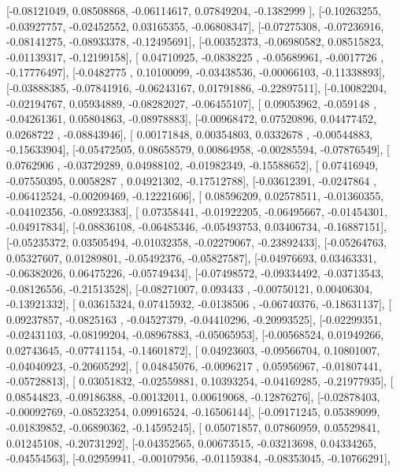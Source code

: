 \documentclass{article}
\begin{document}
       [-0.08121049,  0.08508868, -0.06114617,  0.07849204, -0.1382999 ],
       [-0.10263255, -0.03927757, -0.02452552,  0.03165355, -0.06808347],
       [-0.07275308, -0.07236916, -0.08141275, -0.08933378, -0.12495691],
       [-0.00352373, -0.06980582,  0.08515823, -0.01139317, -0.12199158],
       [ 0.04710925, -0.0838225 , -0.05689961, -0.0017726 , -0.17776497],
       [-0.0482775 ,  0.10100099, -0.03438536, -0.00066103, -0.11338893],
       [-0.03888385, -0.07841916, -0.06243167,  0.01791886, -0.22897511],
       [-0.10082204, -0.02194767,  0.05934889, -0.08282027, -0.06455107],
       [ 0.09053962, -0.059148  , -0.04261361,  0.05804863, -0.08978883],
       [-0.00968472,  0.07520896,  0.04477452,  0.0268722 , -0.08843946],
       [ 0.00171848,  0.00354803,  0.0332678 , -0.00544883, -0.15633904],
       [-0.05472505,  0.08658579,  0.00864958, -0.00285594, -0.07876549],
       [ 0.0762906 , -0.03729289,  0.04988102, -0.01982349, -0.15588652],
       [ 0.07416949, -0.07550395,  0.0058287 ,  0.04921302, -0.17512788],
       [-0.03612391, -0.0247864 , -0.06412524, -0.00209469, -0.12221606],
       [ 0.08596209,  0.02578511, -0.01360355, -0.04102356, -0.08923383],
       [ 0.07358441, -0.01922205, -0.06495667, -0.01454301, -0.04917834],
       [-0.08836108, -0.06485346, -0.05493753,  0.03406734, -0.16887151],
       [-0.05235372,  0.03505494, -0.01032358, -0.02279067, -0.23892433],
       [-0.05264763,  0.05327607,  0.01289801, -0.05492376, -0.05827587],
       [-0.04976693,  0.03463331, -0.06382026,  0.06475226, -0.05749434],
       [-0.07498572, -0.09334492, -0.03713543, -0.08126556, -0.21513528],
       [-0.08271007,  0.093433  , -0.00750121,  0.00406304, -0.13921332],
       [ 0.03615324,  0.07415932, -0.0138506 , -0.06740376, -0.18631137],
       [ 0.09237857, -0.0825163 , -0.04527379, -0.04410296, -0.20993525],
       [-0.02299351, -0.02431103, -0.08199204, -0.08967883, -0.05065953],
       [-0.00568524,  0.01949266,  0.02743645, -0.07741154, -0.14601872],
       [ 0.04923603, -0.09566704,  0.10801007, -0.04040923, -0.20605292],
       [ 0.04845076, -0.0096217 ,  0.05956967, -0.01807441, -0.05728813],
       [ 0.03051832, -0.02559881,  0.10393254, -0.04169285, -0.21977935],
       [ 0.08544823, -0.09186388, -0.00132011,  0.00619068, -0.12876276],
       [-0.02878403, -0.00092769, -0.08523254,  0.09916524, -0.16506144],
       [-0.09171245,  0.05389099, -0.01839852, -0.06890362, -0.14595245],
       [ 0.05071857,  0.07860959,  0.05529841,  0.01245108, -0.20731292],
       [-0.04352565,  0.00673515, -0.03213698,  0.04334265, -0.04554563],
       [-0.02959941, -0.00107956, -0.01159384, -0.08353045, -0.10766291],
\end{document}
